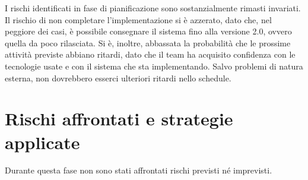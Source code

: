 I rischi identificati in fase di pianificazione sono sostanzialmente rimasti invariati. Il rischio di non completare l'implementazione si è azzerato, dato che, nel peggiore dei casi, è possibile consegnare il sistema fino alla versione 2.0, ovvero quella da poco rilasciata. Si è, inoltre, abbassata la probabilità che le prossime attività previste abbiano ritardi, dato che il team ha acquisito confidenza con le tecnologie usate e con il sistema che sta implementando. Salvo problemi di natura esterna, non dovrebbero esserci ulteriori ritardi nello schedule.

\section{Rischi affrontati e strategie applicate}
Durante questa fase non sono stati affrontati rischi previsti né imprevisti.